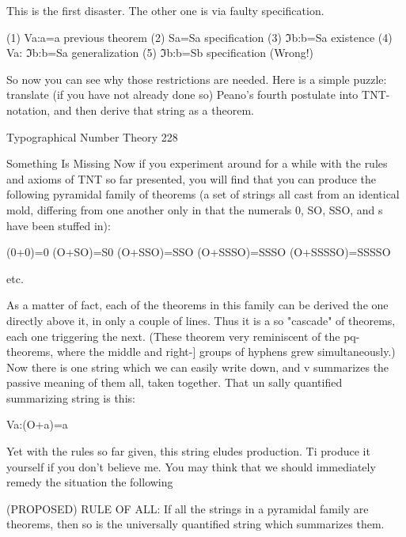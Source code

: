 This is the first disaster. The other one is via faulty specification.

(1)    Va:a=a                          previous theorem
(2)    Sa=Sa                           specification
(3)    ℑb:b=Sa                         existence
(4)    Va: ℑb:b=Sa                     generalization
(5)    ℑb:b=Sb                         specification (Wrong!)

So now you can see why those restrictions are needed.
       Here is a simple puzzle: translate (if you have not already done so) Peano's fourth
postulate into TNT-notation, and then derive that string as a theorem.




Typographical Number Theory                                                             228

                                 Something Is Missing
Now if you experiment around for a while with the rules and axioms of TNT so far
presented, you will find that you can produce the following pyramidal family of theorems
(a set of strings all cast from an identical mold, differing from one another only in that the
numerals 0, SO, SSO, and s have been stuffed in):

                                        (0+0)=0
                                      (O+SO)=S0
                                     (O+SSO)=SSO
                                    (O+SSSO)=SSSO
                                   (O+SSSSO)=SSSSO

                                             etc.

As a matter of fact, each of the theorems in this family can be derived the one directly
above it, in only a couple of lines. Thus it is a so "cascade" of theorems, each one
triggering the next. (These theorem very reminiscent of the pq-theorems, where the
middle and right-] groups of hyphens grew simultaneously.)
         Now there is one string which we can easily write down, and v summarizes the
passive meaning of them all, taken together. That un sally quantified summarizing string
is this:

                                        Va:(O+a)=a

Yet with the rules so far given, this string eludes production. Ti produce it yourself if you
don't believe me.
        You may think that we should immediately remedy the situation the following

(PROPOSED) RULE OF ALL: If all the strings in a pyramidal family are theorems, then
so is the universally quantified string which summarizes them.

